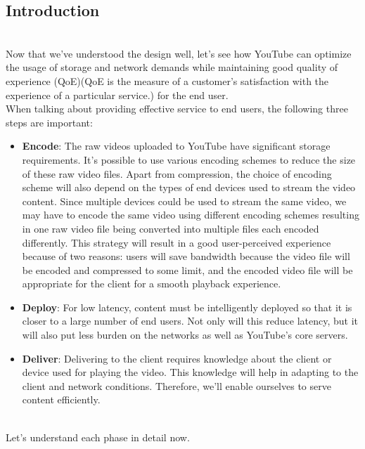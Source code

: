 

\subsection{Introduction}\label{n3S6U8v7EPnC_WNy-A6tX}
\\
Now that we've understood the design well, let's see how YouTube can optimize the usage of storage and network demands while maintaining good quality of experience (QoE)(QoE is the measure of a customer's satisfaction with the experience of a particular service.) for the end user.
\\
When talking about providing effective service to end users, the following three steps are important:

\begin{itemize}
\item
\protect{}\label{YHAskX-YYEWfEEOMSd4ri}
\textbf{Encode}: The raw videos uploaded to YouTube have significant storage requirements. It's possible to use various encoding schemes to reduce the size of these raw video files. Apart from compression, the choice of encoding scheme will also depend on the types of end devices used to stream the video content. Since multiple devices could be used to stream the same video, we may have to encode the same video using different encoding schemes resulting in one raw video file being converted into multiple files each encoded differently. This strategy will result in a good user-perceived experience because of two reasons: users will save bandwidth because the video file will be encoded and compressed to some limit, and the encoded video file will be appropriate for the client for a smooth playback experience.
\item
\protect{}\label{1o8jJXbMDClm3C2XNG3qd}
\textbf{Deploy}: For low latency, content must be intelligently deployed so that it is closer to a large number of end users. Not only will this reduce latency, but it will also put less burden on the networks as well as YouTube's core servers.
\item
\protect{}\label{tAZAJ0Ba23eV5qkfc5K5x}
\textbf{Deliver}: Delivering to the client requires knowledge about the client or device used for playing the video. This knowledge will help in adapting to the client and network conditions. Therefore, we'll enable ourselves to serve content efficiently.
\end{itemize}
\\
Let's understand each phase in detail now.

